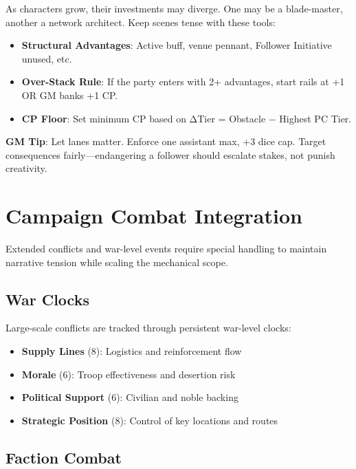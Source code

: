As characters grow, their investments may diverge. One may be a blade-master, another a network architect. Keep scenes tense with these tools:

\begin{itemize}
    \item \textbf{Structural Advantages}: Active buff, venue pennant, Follower Initiative unused, etc.
    \item \textbf{Over-Stack Rule}: If the party enters with 2+ advantages, start rails at +1 OR GM banks +1 CP.
    \item \textbf{CP Floor}: Set minimum CP based on ΔTier = Obstacle − Highest PC Tier.
\end{itemize}

\textbf{GM Tip}: Let lanes matter. Enforce one assistant max, +3 dice cap. Target consequences fairly---endangering a follower should escalate stakes, not punish creativity.

\section*{Campaign Combat Integration}

Extended conflicts and war-level events require special handling to maintain narrative tension while scaling the mechanical scope.

\subsection*{War Clocks}

Large-scale conflicts are tracked through persistent war-level clocks:

\begin{itemize}
    \item \textbf{Supply Lines} (8): Logistics and reinforcement flow
    \item \textbf{Morale} (6): Troop effectiveness and desertion risk
    \item \textbf{Political Support} (6): Civilian and noble backing
    \item \textbf{Strategic Position} (8): Control of key locations and routes
\end{itemize}

\subsection*{Faction Combat}

